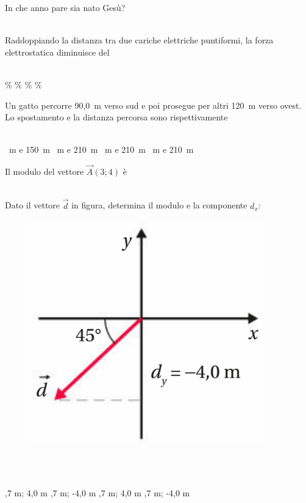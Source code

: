 \documentclass[a4paper,11pt]{exam}
\begin{document}
\begin{questions}
    
\question In che anno pare sia nato Gesù?\\\
\begin{oneparchoices}
\end{oneparchoices}

    
\question Raddoppiando la distanza tra due cariche elettriche puntiformi, la forza elettrostatica diminuisce del\\\
\begin{oneparchoices}
  \choice 75\%
  \%
  \%
  \%
\end{oneparchoices}

    
\question Un gatto percorre 90,0~m verso sud e poi prosegue per altri 120~m verso ovest. Lo spostamento e la distanza percorsa sono rispettivamente\\\
\begin{oneparchoices}
  ~m e 150~m
  \choice 150~m e 210~m
  \choice 30~m e 210~m
  \choice 210~m e 210~m
\end{oneparchoices}

    
\question Il modulo del vettore $\vec{A}(3;4)$ è\\\
\begin{oneparchoices}
\end{oneparchoices}

    
\question Dato il vettore $\vec{d}$ in figura, determina il modulo e la componente $d_x$: \begin{figure}[h!]   \begin{center}     \includegraphics[scale=0.35]{vettored.png}   \end{center} \end{figure}\\\
\begin{oneparchoices}
  \choice 5,7 m; 4,0 m
  \choice 5,7 m; -4,0 m
  \choice -5,7 m; 4,0 m
  \choice -5,7 m; -4,0 m
\end{oneparchoices}


\end{questions}
\end{document}
